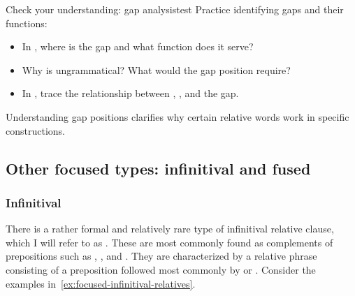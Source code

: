 
\begin{tblsframedsymbol}{Check your understanding: gap analysis}{test}
Practice identifying gaps and their functions:
\begin{itemize}[noitemsep, leftmargin=*]
    \item In , where is the gap and what function does it serve?
    \item Why is  ungrammatical? What would the gap position require?
    \item In , trace the relationship between , , and the gap.
\end{itemize}
Understanding gap positions clarifies why certain relative words work in specific constructions.
\end{tblsframedsymbol}

\subsection{Other focused types: infinitival and fused}
\subsubsection*{Infinitival}

There is a rather formal and relatively rare type of infinitival relative clause, which I will refer to as . These are most commonly found as complements of prepositions such as , , and . They are characterized by a relative phrase consisting of a preposition followed most commonly by  or . Consider the examples in~\ref{ex:focused-infinitival-relatives}.

